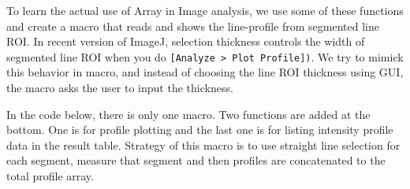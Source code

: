 \documentclass[11pt,a4paper,oneside]{report}
\newcommand{\ijmenu}[1]{\texttt{\small#1}}
\begin{document}
To learn the actual use of Array in Image analysis, we use some of these functions and 
create a macro that reads and shows the line-profile from segmented line ROI. 
In recent version of ImageJ, selection thickness controls the width of segmented
line ROI when you do \ijmenu{[Analyze > Plot Profile])}. We try to mimick this
behavior in macro, and instead of choosing the line ROI thickness using GUI, the
macro asks the user to input the thickness. 

In the code below, there is only one macro. Two functions are added at the
bottom. One is for profile plotting and the last one is for listing
intensity profile data in the result table. Strategy of this macro is to use
straight line selection for each segment, measure that segment and then profiles
are concatenated to the total profile array.

%
%

\end{document}
